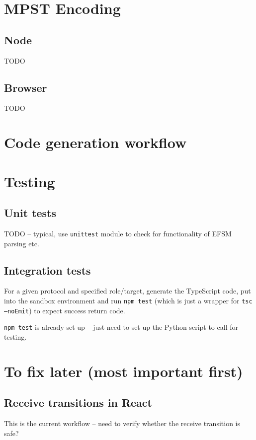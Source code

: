 \documentclass{article}
\begin{document}
\section{MPST Encoding}

\subsection{Node}

TODO

\subsection{Browser}

TODO

\section{Code generation workflow}

\section{Testing}

\subsection{Unit tests}
TODO -- typical, use \texttt{unittest} module
to check for functionality of EFSM parsing
etc.

\subsection{Integration tests}
For a given protocol and specified role/target,
generate the TypeScript code, put into the
sandbox environment and run \texttt{npm test} 
(which is just a wrapper for 
\texttt{tsc --noEmit})
to expect success return code.

\texttt{npm test} is already set up -- just need to
set up the Python script to call for testing.

\section{To fix later (most important first)}

\subsection*{Receive transitions in React}
This is the current workflow -- need to verify whether the receive transition is safe?
\end{document}
